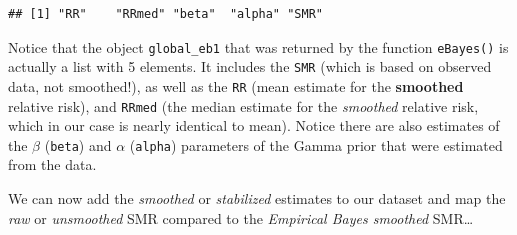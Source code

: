 \documentclass[
]{book}
\newenvironment{Shaded}{\begin{snugshade}}{\end{snugshade}}
\newcommand{\CommentTok}[1]{\textcolor[rgb]{0.56,0.35,0.01}{\textit{#1}}}
\newcommand{\NormalTok}[1]{#1}
\newcommand{\OtherTok}[1]{\textcolor[rgb]{0.56,0.35,0.01}{#1}}
\newcommand{\SpecialCharTok}[1]{\textcolor[rgb]{0.81,0.36,0.00}{\textbf{#1}}}
\begin{document}
\begin{verbatim}
## [1] "RR"    "RRmed" "beta"  "alpha" "SMR"
\end{verbatim}

Notice that the object \texttt{global\_eb1} that was returned by the function \texttt{eBayes()} is actually a list with 5 elements. It includes the \texttt{SMR} (which is based on observed data, not smoothed!), as well as the \texttt{RR} (mean estimate for the \textbf{smoothed} relative risk), and \texttt{RRmed} (the median estimate for the \emph{smoothed} relative risk, which in our case is nearly identical to mean). Notice there are also estimates of the \(\beta\) (\texttt{beta}) and \(\alpha\) (\texttt{alpha}) parameters of the Gamma prior that were estimated from the data.

We can now add the \emph{smoothed} or \emph{stabilized} estimates to our dataset and map the \emph{raw} or \emph{unsmoothed} SMR compared to the \emph{Empirical Bayes smoothed} SMR\ldots{}

\begin{Shaded}
\end{Shaded}
\end{document}
